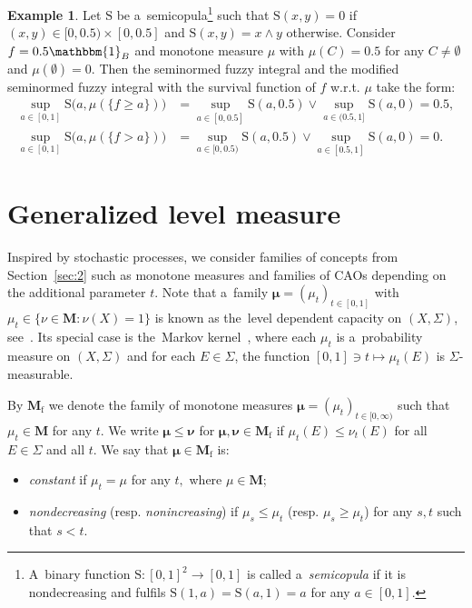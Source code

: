 \documentclass[preprint,11pt]{elsarticle}
\theoremstyle{definition}
\newtheorem{example}[tw]{Example}
\newcommand\bM{\mathbf{M}} %
\newcommand\bMf{\mathbf{M}_{\mathrm{f}}}%
\newcommand{\rS}{\mathrm{S}}
\newcommand{\bmu}{\boldsymbol{\mu}}
\newcommand{\bnu}{\boldsymbol{\nu}}
\renewcommand\ge{\geqslant}
\renewcommand\le{\leqslant}
\newcommand{\mI}[1]{\mathbbm{1}_{#1}}%
\begin{document}
\begin{example}\label{ex:3.21}
Let $\rS$ be a~semicopula\footnote{A~binary function $\rS\colon [0,1]^2\to [0,1]$ is called a~\textit{semicopula} if it is nondecreasing and fulfils $\rS(1, a)=\rS(a, 1)=a$ for any $a\in [0,1].$} such that $\rS(x,y)=0$ if $(x,y)\in [0, 0.5)\times [0,0.5]$ and $\rS(x,y)=x\wedge y$ otherwise. Consider $f=0.5\mI{B}$ and monotone measure $\mu$ with $\mu(C)=0.5$ for any $C\neq \emptyset$ and $\mu(\emptyset)=0.$ Then the seminormed fuzzy integral and the modified seminormed fuzzy integral with the survival function of $f$ w.r.t. $\mu$ take the form:
\begin{align*}
    \sup_{a\in [0,1]} \rS\big(a,\mu(\{ f\ge a\})\big)&=\sup_{a\in [0,0.5]} \rS(a,0.5)\vee \sup_{a\in (0.5,1]} \rS(a,0)=0.5,\\
    \sup_{a\in [0,1]} \rS\big(a,\mu(\{ f> a\})\big)&=\sup_{a\in [0,0.5)} \rS(a,0.5) \vee \sup_{a\in [0.5,1]} \rS(a,0)=0.
\end{align*}
\end{example}
\bigskip


\section{Generalized level measure\label{sec:genlev}}

Inspired by stochastic processes, we consider families of concepts from Section~\ref{sec:2} such as monotone measures and  families of CAOs depending on the additional parameter $t.$
Note that a~family $\bmu=(\mu_t)_{t\in[0,1]}$ with
$\mu_t\in \{\nu\in\bM\colon \nu(X)=1\}$ is known as the~level dependent capacity on $(X, \Sigma)$, see~\cite[Def.\,3.1]{MesiarSmrek2015}.
Its special case is the~Markov kernel~\cite{Kallenberg}, where each $\mu_t$ is a~probability measure on
$(X, \Sigma)$ and for each $E\in \Sigma$, the function $[0,1]\ni t\mapsto \mu_t(E)$ is $\Sigma$-measurable.

By $\bMf$ we denote the family of monotone measures $\bmu=(\mu_t)_{t\in [0,\infty)}$ such that $\mu_t\in \bM$ for any $t.$
We write $\bmu\le\bnu$ for $\bmu,\bnu\in\bMf$ if $\mu_t(E)\le \nu_t(E)$ for all $E\in\Sigma$ and all $t.$
We say that $\bmu\in \bMf$ is:
\begin{itemize}[noitemsep]
    \item \textit{constant} if $\mu_t=\mu$ for any $t,$ where $\mu\in \bM$;
    \item \textit{nondecreasing} (resp. \textit{nonincreasing}) if $\mu_{s}\le \mu_{t}$ (resp. $\mu_{s}\ge \mu_{t}$) for any $s,t$ such that $s<t.$
\end{itemize}
\end{document}
